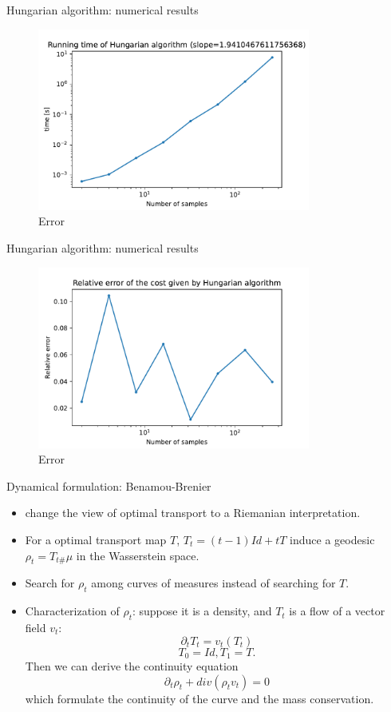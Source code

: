 \documentclass{beamer}
\begin{document}
\begin{frame}{Hungarian algorithm: numerical results}
\begin{figure}
    \centering
    \includegraphics[width=0.8\textwidth]{graphics/hungarian_time.pdf}
    \caption{Error}
    \label{fig:nu}
\end{figure}
\end{frame}
\begin{frame}{Hungarian algorithm: numerical results}
\begin{figure}
    \centering
    \includegraphics[width=0.8\textwidth]{graphics/hungarian_error.pdf}
    \caption{Error}
    \label{fig:nu}
\end{figure}
\end{frame}

\begin{frame}{Dynamical formulation: Benamou-Brenier}
    \begin{itemize}
        \item change the view of optimal transport to a Riemanian interpretation.
        \item For a optimal transport map $T$, $T_t=(t-1)Id + tT$ induce a geodesic $\rho_t = T_{t\#}\mu$ in the Wasserstein space.
        \item Search for $\rho_t$ among curves of measures instead of searching for $T$.
        \item Characterization of $\rho_t$: suppose it is a density, and $T_t$ is a flow of a vector field $v_t$:
        $$\partial_t T_t = v_t(T_t)$$
        $$T_0 =Id, T_1=T.$$
        Then we can derive the continuity equation $$\partial_t\rho_t + div(\rho_tv_t) = 0$$
        which formulate the continuity of the curve and the mass conservation.
        \end{itemize}
\end{frame}
\end{document}

